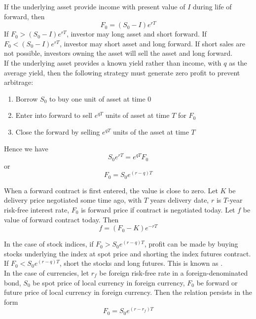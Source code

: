 If the underlying asset provide income with present value of $I$ during life of forward, then
\begin{equation}
F_0 = (S_0 - I)e^{rT} \nonumber
\end{equation}
If $F_0 > (S_0 - I)e^{rT}$, investor may long asset and short forward. If $F_0 < (S_0 - I)e^{rT}$, investor may short asset and long forward. If short sales are not possible, investors owning the asset will sell the asset and long forward.\\

If the underlying asset provides a known yield rather than income, with $q$ as the average yield, then the following strategy must generate zero profit to prevent arbitrage:
\begin{enumerate}[label=\arabic*.]
\setlength{\itemsep}{0pt}
\item Borrow $S_0$ to buy one unit of asset at time $0$
\item Enter into forward to sell $e^{qT}$ units of asset at time $T$ for $F_0$
\item Close the forward by selling $e^{qT}$ units of the asset at time $T$
\end{enumerate}
Hence we have
\begin{equation}
S_0 e^{rT} = e^{qT} F_0 \nonumber 
\end{equation}
or
\begin{equation}
F_0 = S_0 e^{(r-q)T} \nonumber
\end{equation}

When a forward contract is first entered, the value is close to zero. Let $K$ be delivery price negotiated some time ago, with $T$ years delivery date, $r$ is $T$-year risk-free interest rate, $F_0$ is forward price if contract is negotiated today. Let $f$ be value of forward contract today. Then
\begin{equation}
f = (F_0 - K)e^{-rT} \nonumber
\end{equation}

In the case of stock indices, if $F_0 > S_0 e^{(r-q)T}$, profit can be made by buying stocks underlying the index at spot price and shorting the index futures contract. If $F_0 < S_0 e^{(r-q)T}$, short the stocks and long futures. This is known as .\\

In the case of currencies, let $r_f$ be foreign risk-free rate in a foreign-denominated bond, $S_0$ be spot price of local currency in foreign currency, $F_0$ be forward or future price of local currency in foreign currency. Then the  relation persists in the form
\begin{equation}
F_0 = S_0 e^{(r-r_f)T} \nonumber
\end{equation}

